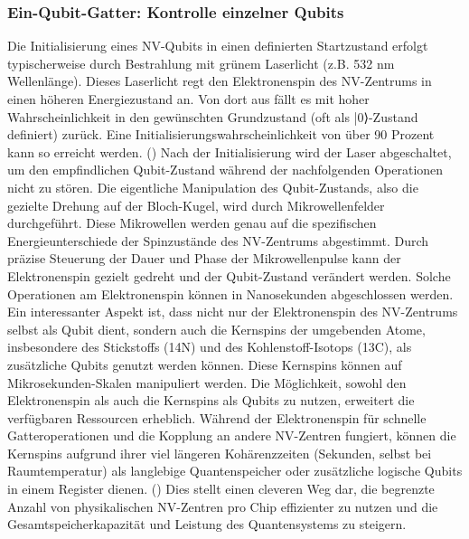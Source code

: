 \subsubsection{Ein-Qubit-Gatter: Kontrolle einzelner Qubits}
Die Initialisierung eines NV-Qubits in einen definierten Startzustand erfolgt typischerweise durch Bestrahlung mit grünem Laserlicht (z.B. 532 nm Wellenlänge). Dieses Laserlicht regt den Elektronenspin des NV-Zentrums in einen höheren Energiezustand an. Von dort aus fällt es mit hoher Wahrscheinlichkeit in den gewünschten Grundzustand (oft als |0⟩-Zustand definiert) zurück. Eine Initialisierungswahrscheinlichkeit von über 90 Prozent kann so erreicht werden. (\cite{shiRoomtemperatureImplementationDeutschJozsa2010}) Nach der Initialisierung wird der Laser abgeschaltet, um den empfindlichen Qubit-Zustand während der nachfolgenden Operationen nicht zu stören.
Die eigentliche Manipulation des Qubit-Zustands, also die gezielte Drehung auf der Bloch-Kugel, wird durch Mikrowellenfelder durchgeführt. Diese Mikrowellen werden genau auf die spezifischen Energieunterschiede der Spinzustände des NV-Zentrums abgestimmt. Durch präzise Steuerung der Dauer und Phase der Mikrowellenpulse kann der Elektronenspin gezielt gedreht und der Qubit-Zustand verändert werden. Solche Operationen am Elektronenspin können in Nanosekunden abgeschlossen werden. Ein interessanter Aspekt ist, dass nicht nur der Elektronenspin des NV-Zentrums selbst als Qubit dient, sondern auch die Kernspins der umgebenden Atome, insbesondere des Stickstoffs (14N) und des Kohlenstoff-Isotops (13C), als zusätzliche Qubits genutzt werden können. Diese Kernspins können auf Mikrosekunden-Skalen manipuliert werden. Die Möglichkeit, sowohl den Elektronenspin als auch die Kernspins als Qubits zu nutzen, erweitert die verfügbaren Ressourcen erheblich. Während der Elektronenspin für schnelle Gatteroperationen und die Kopplung an andere NV-Zentren fungiert, können die Kernspins aufgrund ihrer viel längeren Kohärenzzeiten (Sekunden, selbst bei Raumtemperatur) als langlebige Quantenspeicher oder zusätzliche logische Qubits in einem Register dienen. (\cite{childressDiamondNVCenters2013})  Dies stellt einen cleveren Weg dar, die begrenzte Anzahl von physikalischen NV-Zentren pro Chip effizienter zu nutzen und die Gesamtspeicherkapazität und Leistung des Quantensystems zu steigern.
